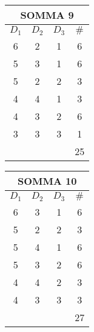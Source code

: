 \documentclass{subfiles}
\begin{document}
\begin{center}
    \begin{minipage}{0.45\textwidth}
        \begin{tabular}{|c|c|c|c|}
            \hline
            \multicolumn{4}{|c|}{SOMMA 9}                           \\
            \hline
            \(D_{1}\)              & \(D_{2}\) & \(D_{3}\) & \(\#\) \\
            \hline
            6                      & 2         & 1         & 6      \\
            5                      & 3         & 1         & 6      \\
            5                      & 2         & 2         & 3      \\
            4                      & 4         & 1         & 3      \\
            4                      & 3         & 2         & 6      \\
            3                      & 3         & 3         & 1      \\
            \hline
            \multicolumn{3}{|c|}{} & 25                             \\
            \hline
        \end{tabular}
    \end{minipage}
    \begin{minipage}{0.45\textwidth}
        \begin{tabular}{|c|c|c|c|}
            \hline
            \multicolumn{4}{|c|}{SOMMA 10}                          \\
            \hline
            \(D_{1}\)              & \(D_{2}\) & \(D_{3}\) & \(\#\) \\
            \hline
            6                      & 3         & 1         & 6      \\
            5                      & 2         & 2         & 3      \\
            5                      & 4         & 1         & 6      \\
            5                      & 3         & 2         & 6      \\
            4                      & 4         & 2         & 3      \\
            4                      & 3         & 3         & 3      \\
            \hline
            \multicolumn{3}{|c|}{} & 27                             \\
            \hline
        \end{tabular}
    \end{minipage}
\end{center}
\end{document}
